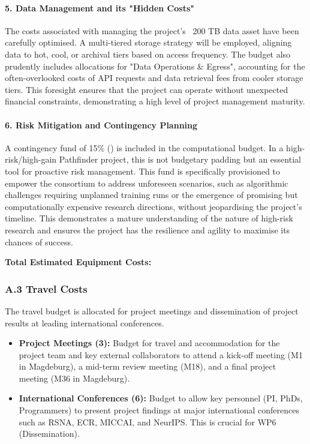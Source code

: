 \paragraph{5. Data Management and its "Hidden Costs"}
The costs associated with managing the project's ~200 TB data asset have been carefully optimised. A multi-tiered storage strategy will be employed, aligning data to hot, cool, or archival tiers based on access frequency. The budget also prudently includes allocations for "Data Operations \& Egress", accounting for the often-overlooked costs of API requests and data retrieval fees from cooler storage tiers. This foresight ensures that the project can operate without unexpected financial constraints, demonstrating a high level of project management maturity.

\paragraph{6. Risk Mitigation and Contingency Planning}
A contingency fund of 15\% () is included in the computational budget. In a high-risk/high-gain Pathfinder project, this is not budgetary padding but an essential tool for proactive risk management. This fund is specifically provisioned to empower the consortium to address unforeseen scenarios, such as algorithmic challenges requiring unplanned training runs or the emergence of promising but computationally expensive research directions, without jeopardising the project's timeline. This demonstrates a mature understanding of the nature of high-risk research and ensures the project has the resilience and agility to maximise its chances of success.

\textbf{Total Estimated Equipment Costs: }

\subsubsection*{A.3 Travel Costs}
The travel budget is allocated for project meetings and dissemination of project results at leading international conferences.
\begin{itemize}
    \item \textbf{Project Meetings (3):} Budget for travel and accommodation for the project team and key external collaborators to attend a kick-off meeting (M1 in Magdeburg), a mid-term review meeting (M18), and a final project meeting (M36 in Magdeburg).
    \item \textbf{International Conferences (6):} Budget to allow key personnel (PI, PhDs, Programmers) to present project findings at major international conferences such as RSNA, ECR, MICCAI, and NeurIPS. This is crucial for WP6 (Dissemination).
\end{itemize}

